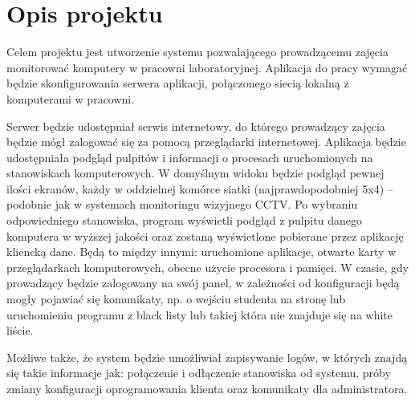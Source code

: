 \section {Opis projektu}
Celem projektu jest utworzenie systemu pozwalającego prowadzącemu zajęcia monitorować komputery w pracowni laboratoryjnej. Aplikacja do pracy wymagać będzie skonfigurowania serwera aplikacji, połączonego siecią lokalną z komputerami w pracowni. 

Serwer będzie udostępniał serwis internetowy, do którego prowadzący zajęcia będzie mógł zalogować się za pomocą przeglądarki internetowej. Aplikacja będzie udostępniała podgląd pulpitów i informacji o procesach uruchomionych na stanowiskach komputerowych. W domyślnym widoku będzie podgląd pewnej ilości ekranów, każdy w oddzielnej komórce siatki (najprawdopodobniej 5x4) -- podobnie jak w systemach monitoringu wizyjnego CCTV. Po wybraniu odpowiedniego stanowiska, program wyświetli podgląd z pulpitu danego komputera w wyższej jakości oraz zostaną wyświetlone pobierane przez aplikację kliencką dane. Będą to między innymi: uruchomione aplikacje, otwarte karty w przeglądarkach komputerowych, obecne użycie procesora i pamięci. W czasie, gdy prowadzący będzie zalogowany na swój panel, w zależności od konfiguracji będą mogły pojawiać się komunikaty, np. o wejściu studenta na stronę lub uruchomieniu programu z black listy lub takiej która nie znajduje się na white liście. 

Możliwe także, że system będzie umożliwiał zapisywanie logów, w których znajdą się takie informacje jak: połączenie i odłączenie stanowiska od systemu, próby zmiany konfiguracji oprogramowania klienta oraz komunikaty dla administratora.